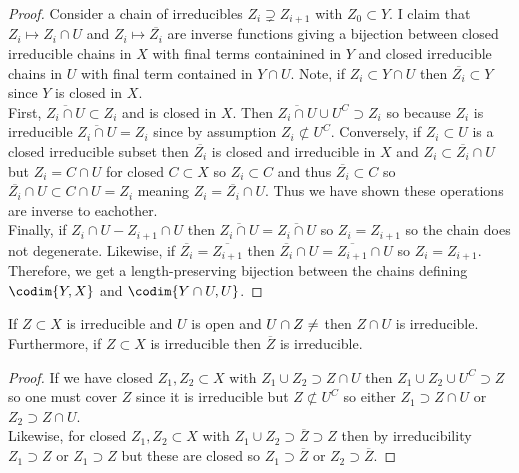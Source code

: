 \documentclass[12pt]{article}
\begin{document}
\begin{proof}
Consider a chain of irreducibles $Z_i \supsetneq Z_{i+1}$ with $Z_0 \subset Y$. I claim that $Z_i \mapsto Z_i \cap U$ and $Z_i \mapsto \overline{Z_i}$ are inverse functions giving a bijection between closed irreducible chains in $X$ with final terms containined in $Y$ and closed irreducible chains in $U$ with final term contained in $Y \cap  U$. Note, if $Z_i \subset Y \cap U$ then $\overline{Z_i} \subset Y$ since $Y$ is closed in $X$.
\bigskip\\
First, $\overline{Z_i \cap U} \subset Z_i$ and is closed in $X$. Then $\overline{Z_i \cap U} \cup U^C \supset Z_i$ so because $Z_i$ is irreducible $\overline{Z_i \cap U} = Z_i$ since by assumption $Z_i \not\subset U^C$. Conversely, if $Z_i \subset U$ is a closed irreducible subset then $\overline{Z_i}$ is closed and irreducible in $X$ and $Z_i \subset \overline{Z_i} \cap U$ but $Z_i = C \cap U$ for closed $C \subset X$ so $Z_i \subset C$ and thus $\overline{Z_i} \subset C$ so $\overline{Z_i} \cap U \subset C \cap U = Z_i$ meaning $Z_i = \overline{Z_i} \cap U$. Thus we have shown these operations are inverse to eachother.
\bigskip\\
Finally, if $Z_i \cap U - Z_{i+1} \cap U$ then $\overline{Z_i \cap U} = \overline{Z_i \cap U}$ so $Z_i = Z_{i+1}$ so the chain does not degenerate. Likewise, if $\overline{Z_i} = \overline{Z_{i+1}}$ then $\overline{Z_i} \cap U = \overline{Z_{i+1}} \cap U$ so $Z_i = Z_{i+1}$. Therefore, we get a length-preserving bijection between the chains defining $\codim{Y,X}$ and $\codim{Y \cap U, U}$. 
\end{proof}

\begin{lemma}
If $Z \subset X$ is irreducible and $U$ is open and $U \cap Z \neq \empty$ then $Z \cap U$ is irreducible. Furthermore, if $Z \subset X$ is irreducible then $\overline{Z}$ is irreducible.
\end{lemma}

\begin{proof}
If we have closed $Z_1, Z_2 \subset X$ with $Z_1 \cup Z_2 \supset Z \cap U$ then $Z_1 \cup Z_2 \cup U^C \supset Z$ so one must cover $Z$ since it is irreducible but $Z \not\subset U^C$ so either $Z_1 \supset Z \cap U$ or $Z_2 \supset Z \cap U$.
\bigskip\\
Likewise, for closed $Z_1, Z_2 \subset X$ with $Z_1 \cup Z_2 \supset \overline{Z} \supset Z$ then by irreducibility $Z_1 \supset Z$ or $Z_1 \supset Z$ but these are closed so $Z_1 \supset \overline{Z}$ or $Z_2 \supset \overline{Z}$. 
\end{proof}
\end{document}
